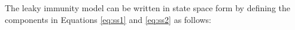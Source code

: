 \documentclass{article}
\begin{document}

The leaky immunity model can be written in state space form by defining the
components in Equations \ref{eq:ss1} and \ref{eq:ss2} as follows:

\end{document}
